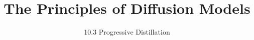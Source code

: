 ﻿%

\title{The Principles of Diffusion Models}
\subtitle{10.3 Progressive Distillation}


\begin{frame}
    \titlepage
\end{frame}


